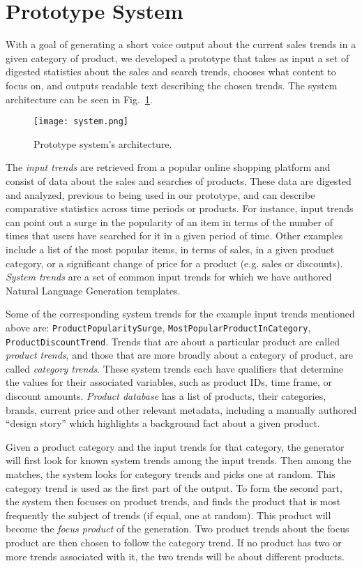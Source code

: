 \section{Prototype System}

With a goal of generating a short voice output about the current sales trends in a given category of product, we developed a prototype that takes as input a set of digested statistics about the sales and search trends, chooses what content to focus on, and outputs readable text describing the chosen trends. The system architecture can be seen in Fig.~\ref{fig:proto}. \vspace{-2mm}

\begin{figure}[h]
  \texttt{[image: system.png]}
  \caption{Prototype system's architecture.}
  \label{fig:proto}
\end{figure}

The \textit{input trends} are retrieved from a popular online shopping platform and consist of data about the sales and searches of products. These data are digested and analyzed, previous to being used in our prototype, and can describe comparative statistics across time periods or products. For instance, input trends can point out a surge in the popularity of an item in terms of the number of times that users have searched for it in a given period of time. Other examples include a list of the most popular items, in terms of sales, in a given product category, or a significant change of price for a product (e.g. sales or discounts). \textit{System trends} are a set of common input trends for which we have authored Natural Language Generation templates. 

Some of the corresponding system trends for the example input trends mentioned above are: {\tt ProductPopularitySurge}, {\tt MostPopularProductInCategory}, {\tt ProductDiscountTrend}. Trends that are about a particular product are called \textit{product trends}, and those that are more broadly about a category of product, are called \textit{category trends}. These system trends each have qualifiers that determine the values for their associated variables, such as product IDs, time frame, or discount amounts. \textit{Product database} has a list of products, their categories, brands, current price and other relevant metadata, including a manually authored ``design story'' which highlights a background fact about a given product.

Given a product category and the input trends for that category, the generator will first look for known system trends among the input trends. Then among the matches, the system looks for category trends and picks one at random. This category trend is used as the first part of the output. To form the second part, the system then focuses on product trends, and finds the product that is most frequently the subject of trends (if equal, one at random). This product will become the \textit{focus product} of the generation. Two product trends about the focus product are then chosen to follow the category trend. If no product has two or more trends associated with it, the two trends will be about different products. 

